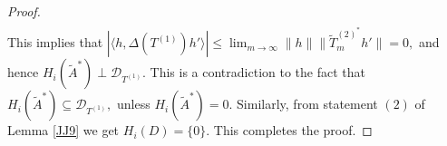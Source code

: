 \documentclass[12pt]{amsart}
\numberwithin{equation}{section}
\theoremstyle{plain}
\newtheorem{theorem}{Theorem}[section]
\newcommand{\ot}{\otimes}
\newcommand{\wt}{\widetilde}
\newcommand{\wT}{\wt{T}}
\begin{document}
\begin{proof}
\begin{align*}
	\end{align*} This implies that $|\langle h,\Delta(T^{(1)})h'\rangle|\le \lim_{m\to \infty} \|h\|\|\wT_m^{(2)^*}h'\|=0,$ and hence $H_i(\widetilde{A}^*)\perp \mathcal{D}_{ T^{(1)}}.$ This is a contradiction to the fact that $H_i(\widetilde{A}^*)\subseteq \mathcal{D}_{ T^{(1)}},$
unless $H_i(\widetilde{A}^*)=0.$ Similarly, from statement $(2)$ of Lemma \ref{JJ9} we get $H_i(D)=\{0\}.$ This completes the proof. 
\end{proof}

\end{document}
